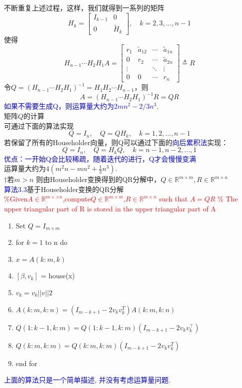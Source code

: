 \documentclass[12pt,a4paper]{article}
\begin{document}
不断重复上述过程，这样，我们就得到一系列的矩阵
$$
H_{k}=\left[\begin{array}{cc}{I_{k-1}} & {0} \\ {0} & {\tilde{H}_{k}}\end{array}\right], \quad k=2,3, \ldots, n-1
$$
使得
$$
H_{n-1} \cdots H_{2} H_{1} A=\left[\begin{array}{cccc}{r_{1}} & {\tilde{a}_{12}} & {\cdots} & {\tilde{a}_{1 n}} \\ {0} & {r_{2}} & {\cdots} & {\tilde{a}_{2 n}} \\ {\vdots} & {} & {\ddots} & {\vdots} \\ {0} & {0} & {\cdots} & {r_{n}}\end{array}\right] \triangleq R
$$
令$Q=\left(H_{n-1} \cdots H_{2} H_{1}\right)^{-1}=H_{1} H_{2} \cdots H_{n-1}$，则
$$
A=\left(H_{n-1} \cdots H_{2} H_{1}\right)^{-1} R=Q R
$$
\textcolor{blue}{如果不需要生成Q，则运算量大约为$2mn^{2}-2/3n^{3}$}.\\

\noindent 矩阵$Q$的计算\\
可通过下面的算法实现
$$
Q=I_{n}, \quad Q=Q H_{k}, \quad k=1,2, \ldots, n-1
$$
若保留了所有的Householder向量，则Q可以通过下面的\textcolor{blue}{向后累积法}实现：
$$
Q=I_{n}, \quad Q=H_{k} Q, \quad k=n-1, n-2, \ldots, 1
$$
\textcolor{blue}{优点：一开始Q会比较稀疏，随着迭代的进行，Q才会慢慢变满}\\
运算量大约为$4(m^{2}n-mn^{2}+\frac{1}{3}n^{3})$.\\
$\dagger$若$m>n$ 则由Householder变换得到的QR分解中，$Q\in\mathbb{R}^{m\times m},R\in\mathbb{R}^{m\times n}$
\textcolor{blue}\\

\noindent \textcolor{blue}{算法3.3}基于Householder变换的QR分解\\
\textcolor{red}{\%Given$A \in \mathbb{R}^{m×\times n}$,compute$Q \in \mathbb{R}^{m\times m}$,$R\in \mathbb{R}^{m\times n}$ such that $A = QR$ \% The upper triangular part of R is stored in the upper triangular part of A}
\begin{enumerate}[1:]
\item Set $Q=I_{m\times m}$
\item for $k=1$ to n do
\item \qquad $x=A(k:m,k)$
\item \qquad$[\beta, v_{k}]$ = house(x)
\item \qquad$v_{k} = v_{k}||v||2$
\item \qquad$A(k:m,k:n)=(I_{m-k+1} −2v_{k}v_{k}^{T})A(k:m,k:n)$
\item \qquad$Q(1:k−1,k:m)=Q(1:k−1,k:m)(I_{m−k+1} -2v_{k}v_{k}^{⊺})$
\item \qquad$Q(k:m,k:m)=Q(k:m,k:m)(I_{m−k+1} -2v_{k}v_{k}^{T})$
\item end for
\end{enumerate}
\textcolor{blue}{上面的算法只是一个简单描述, 并没有考虑运算量问题}.\\
\end{document}
